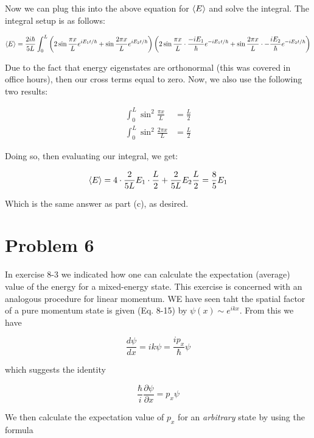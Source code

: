 \documentclass[10pt]{article}
\begin{document}
\begin{enumerate}[(a)]
\begin{solution}
            Now we can plug this into the above equation for $\langle E \rangle$ and solve the integral. The integral setup is as follows: 

            \[\langle E \rangle = \frac{2i\hbar}{5L} \int_0^L \left( 2 \sin \frac{\pi x}{L} e^{iE_1t/\hbar} + \sin \frac{2\pi x}{L} e^{iE_2t/\hbar}\right)\left(2 \sin \frac{\pi x}{L} \cdot \frac{-iE_1}{\hbar} e^{-iE_1t/\hbar} + \sin \frac{2\pi x}{L} \cdot -\frac{iE_2}{\hbar} e^{-iE_2t/\hbar}\right)\]

            Due to the fact that energy eigenstates are orthonormal (this was covered in office hours), then our cross terms equal to zero. Now, we also use the following two results: 

            \begin{align*}
                \int_0^L \sin^2 \frac{\pi x}{L} &= \frac{L}{2}\\
                \int_0^L \sin^2 \frac{2 \pi x}{L} &= \frac{L}{2}
            \end{align*}

            Doing so, then evaluating our integral, we get:

            \[ \langle E \rangle = 4 \cdot  \frac{2}{5L} E_1 \cdot \frac{L}{2} + \frac{2}{5L} E_2 \frac{L}{2} = \frac{8}{5}E_1\] 

            Which is the same answer as part (c), as desired. 
        \end{solution}
    \end{enumerate}

    \pagebreak

    \section*{Problem 6}

    In exercise 8-3 we indicated how one can calculate the expectation (average) value of the energy for a mixed-energy state. This exercise is concerned with an analogous procedure for linear momentum. WE have seen taht the spatial factor of a pure momentum state is given (Eq. 8-15) by $\psi(x) \sim e^{ikx}$. From this we have 

    \[ \frac{d\psi}{dx} = ik\psi = \frac{ip_x}{\hbar}\psi\] 

    which suggests the identity 

    \[ \frac \hbar i \frac{\partial \psi}{\partial x} = p_x \psi\] 

    We then calculate the expectation value of $p_x$ for an \textit{arbitrary} state by using the formula 
\end{document}
